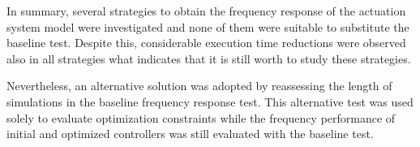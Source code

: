 In summary, several strategies to obtain the frequency response of the actuation system model were investigated and none of them were suitable to substitute the baseline test. Despite this, considerable execution time reductions were observed also in all strategies what indicates that it is still worth to study these strategies. 

Nevertheless, an alternative solution was adopted by reassessing the length of simulations in the baseline frequency response test. This alternative test was used solely to evaluate optimization constraints while the frequency performance of initial and optimized controllers was still evaluated with the baseline test.

%
%
%
%
%
%
